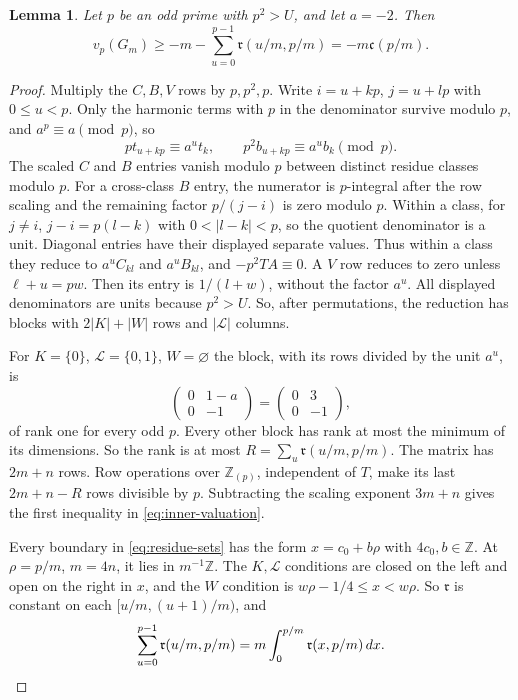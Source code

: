 \documentclass{amsart}
\newtheorem{lemma}{Lemma}[section]
\numberwithin{equation}{section}
\numberwithin{table}{section}
\newcommand{\Z}{\mathbb{Z}}
\begin{document}
\begin{lemma}\label{lem:residue-bound}
Let $p$ be an odd prime with $p^2>U$, and let $a=-2$. Then
\begin{equation}\label{eq:inner-valuation}
 v_p(G_m)\ge-m-\sum_{u=0}^{p-1}\mathfrak r(u/m,p/m)=-m\mathfrak c(p/m).
\end{equation}
\end{lemma}
\begin{proof}
Multiply the $C,B,V$ rows by $p,p^2,p$. Write $i=u+kp$, $j=u+lp$ with
$0\le u<p$. Only the harmonic terms with $p$ in the denominator survive
modulo $p$, and $a^p\equiv a\pmod p$, so
\[
 pt_{u+kp}\equiv a^ut_k,\qquad p^2b_{u+kp}\equiv a^ub_k\pmod p.
\]
The scaled $C$ and $B$ entries vanish modulo $p$ between distinct residue
classes modulo $p$. For a cross-class $B$ entry, the numerator is $p$-integral after
the row scaling and the remaining factor $p/(j-i)$ is zero modulo $p$.
Within a class, for $j\ne i$, $j-i=p(l-k)$ with $0<|l-k|<p$, so the
quotient denominator is a unit. Diagonal entries have their displayed
separate values. Thus within a class they reduce to $a^uC_{kl}$ and
$a^uB_{kl}$, and
$-p^2TA\equiv0$. A $V$ row reduces to zero unless $\ell+u=pw$. Then its
entry is $1/(l+w)$, without the factor $a^u$. All displayed denominators
are units because $p^2>U$. So, after permutations, the reduction has blocks
with $2|K|+|W|$ rows and $|\mathcal L|$ columns.

For $K=\{0\}$, $\mathcal L=\{0,1\}$, $W=\varnothing$ the block, with its rows
divided by the unit $a^u$, is
\begin{equation}\label{eq:rank-one-block}
 \begin{pmatrix}0&1-a\\0&-1\end{pmatrix}
 =\begin{pmatrix}0&3\\0&-1\end{pmatrix},
\end{equation}
of rank one for every odd $p$. Every other block has rank at most the
minimum of its dimensions. So the rank is at most
$R=\sum_u \mathfrak r(u/m,p/m)$.
The matrix has $2m+n$ rows. Row operations over $\Z_{(p)}$, independent of
$T$, make its last $2m+n-R$ rows divisible by $p$. Subtracting the scaling
exponent $3m+n$ gives the first inequality in \eqref{eq:inner-valuation}.

Every boundary in \eqref{eq:residue-sets} has the form $x=c_0+b\rho$ with
$4c_0,b\in\Z$. At $\rho=p/m$, $m=4n$, it lies in $m^{-1}\Z$. The $K,\mathcal L$
conditions are closed on the left and open on the right in $x$, and the
$W$ condition is $w\rho-1/4\le x<w\rho$. So $\mathfrak r$ is constant on
each $[u/m,(u+1)/m)$, and
\begin{equation}\label{eq:lattice-sum}
 \sum_{u=0}^{p-1}\mathfrak r(u/m,p/m)=m\int_0^{p/m}\mathfrak r(x,p/m)\,dx.\qedhere
\end{equation}
\end{proof}
\end{document}
